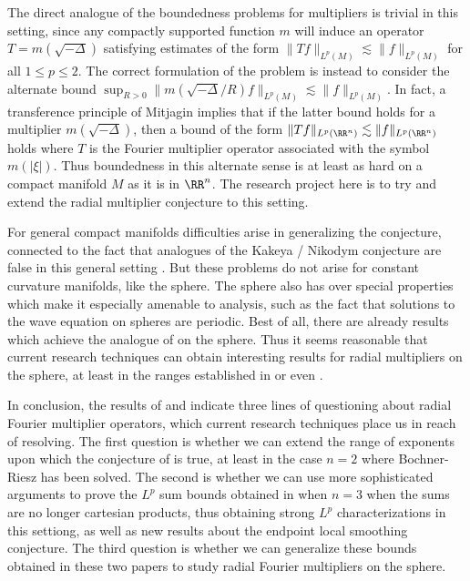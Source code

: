 The direct analogue of the boundedness problems for multipliers is trivial in this setting, since any compactly supported function $m$ will induce an operator $T = m(\sqrt{-\Delta})$ satisfying estimates of the form $\| Tf \|_{L^p(M)} \lesssim \| f \|_{L^p(M)}$ for all $1 \leq p \leq 2$. The correct formulation of the problem is instead to consider the alternate bound $\sup_{R > 0} \| m(\sqrt{-\Delta}/R) f \|_{L^p(M)} \lesssim \| f \|_{L^p(M)}$. In fact, a transference principle of Mitjagin \cite{Mitjagin} implies that if the latter bound holds for a multiplier $m(\sqrt{-\Delta})$, then a bound of the form $\| Tf \|_{L^p(\RR^n)} \lesssim \| f \|_{L^p(\RR^n)}$ holds where $T$ is the Fourier multiplier operator associated with the symbol $m(|\xi|)$. Thus boundedness in this alternate sense is at least as hard on a compact manifold $M$ as it is in $\RR^n$. The research project here is to try and extend the radial multiplier conjecture to this setting.

For general compact manifolds difficulties arise in generalizing the conjecture, connected to the fact that analogues of the Kakeya / Nikodym conjecture are false in this general setting \cite{Minicozzi}. But these problems do not arise for constant curvature manifolds, like the sphere. The sphere also has over special properties which make it especially amenable to analysis, such as the fact that solutions to the wave equation on spheres are periodic. Best of all, there are already results which achieve the analogue of \cite{GarrigosandSeeger} on the sphere. Thus it seems reasonable that current research techniques can obtain interesting results for radial multipliers on the sphere, at least in the ranges established in \cite{HeoandNazarovandSeeger} or even \cite{Cladek}.

In conclusion, the results of \cite{HeoandNazarovandSeeger} and \cite{Cladek} indicate three lines of questioning about radial Fourier multiplier operators, which current research techniques place us in reach of resolving. The first question is whether we can extend the range of exponents upon which the conjecture of \cite{GarrigosandSeeger} is true, at least in the case $n = 2$ where Bochner-Riesz has been solved. The second is whether we can use more sophisticated arguments to prove the $L^p$ sum bounds obtained in \cite{Cladek} when $n = 3$ when the sums are no longer cartesian products, thus obtaining strong $L^p$ characterizations in this settiong, as well as new results about the endpoint local smoothing conjecture. The third question is whether we can generalize these bounds obtained in these two papers to study radial Fourier multipliers on the sphere. 

